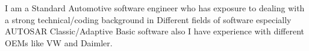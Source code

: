
\begin{cvitems} %
   {
    \item{
    \normalsize I am a Standard Automotive software engineer who has exposure to dealing with a 
            strong technical/coding background in Different fields of software especially AUTOSAR Classic/Adaptive 
            Basic software also I have experience with different OEMs like VW and Daimler.}
            
   }
\end{cvitems}   
